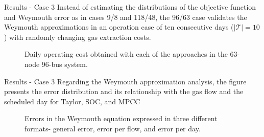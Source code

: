 \documentclass[hyperref={colorlinks,citecolor=blue,linkcolor=blue,urlcolor=blue}]{beamer}
\newlength\figureheight
\newlength\figurewidth
\begin{document}
\begin{frame}{Results - Case 3}
Instead of estimating the distributions of the objective function and Weymouth error as in cases 9/8 and 118/48, the 96/63 case validates the Weymouth approximations in an operation case of ten consecutive days ($\left | \mathcal{T} \right | = 10 $) with randomly changing gas extraction costs.
    \begin{figure}[!htb]
    \centering
    \setlength{}        
    \setlength{}
    
    \caption{Daily operating cost obtained with each of the approaches in the 63-node 96-bus system.}
    \label{fig:red_test_cost}
\end{figure}
\end{frame}


\begin{frame}{Results - Case 3}
    Regarding the Weymouth approximation analysis, the figure presents the error distribution and its relationship with the gas flow and the scheduled day for Taylor, SOC, and MPCC

    \begin{figure}[!htb]
\setlength{}        
\setlength{}
\caption{Errors in the Weymouth equation expressed in three different formats- general error, error per flow, and error per day.}\label{fig:red_test_error}
\end{figure}
\end{frame}
\end{document}
